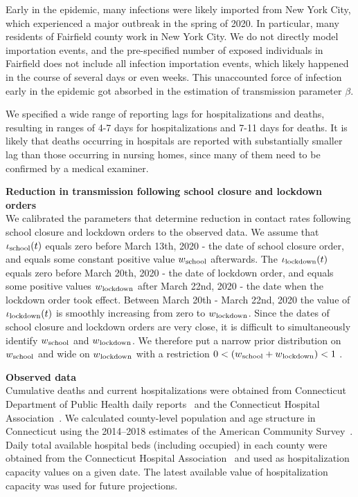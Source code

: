 \documentclass[11pt]{article}
\begin{document}
Early in the epidemic, many infections were likely imported from New York City, which experienced a major outbreak in the spring of 2020. In particular, many residents of Fairfield county work in New York City. We do not directly model importation events, and the pre-specified number of exposed individuals in Fairfield does not include all infection importation events, which likely happened in the course of several days or even weeks. This unaccounted force of infection early in the epidemic got absorbed in the estimation of transmission parameter $\beta$.

We specified a wide range of reporting lags for hospitalizations and deaths, resulting in ranges of 4-7 days for hospitalizations and 7-11 days for deaths. It is likely that deaths occurring in hospitals are reported with substantially smaller lag than those occurring in nursing homes, since many of them need to be confirmed by a medical examiner.  

\textbf{Reduction in transmission following school closure and lockdown orders} \\[0.5em]
We calibrated the parameters that determine reduction in contact rates following school closure and lockdown orders to the observed data. 
We assume that $\iota\textsubscript{school}(t)$ equals zero before March 13th, 2020 - the date of school closure order, and equals some constant positive value $w\textsubscript{school}$ afterwards. 
The  $\iota\textsubscript{lockdown} (t)$ equals zero before March 20th, 2020 - the date of lockdown order, and equals some positive values $w\textsubscript{lockdown}$ after March 22nd, 2020 - the date when the lockdown order took effect. Between March 20th - March 22nd, 2020 the value of $\iota\textsubscript{lockdown} (t)$ is smoothly increasing from zero to $w\textsubscript{lockdown}$. 
Since the dates of school closure and lockdown orders are very close, it is difficult to simultaneously identify $w\textsubscript{school}$ and $w\textsubscript{lockdown}$. We therefore put a narrow prior distribution on $w\textsubscript{school}$ and wide on $w\textsubscript{lockdown}$ with a restriction $ 0 < (w\textsubscript{school} + w\textsubscript{lockdown}) < 1$ . 


\textbf{Observed data} \\[0.5em]
Cumulative deaths and current hospitalizations were obtained from Connecticut Department of Public Health daily reports~\citep{DPHwebsite} and the Connecticut Hospital Association~\citep{CHAwebsite}. 
We calculated county-level population and age structure in Connecticut using the 2014--2018 estimates of the American Community Survey~\citep{acs2018}. 
Daily total available hospital beds (including occupied) in each county were obtained from the Connecticut Hospital Association~\citep{CHAwebsite} and used as hospitalization capacity values on a given date. The latest available value of hospitalization capacity was used for future projections.
\end{document}
